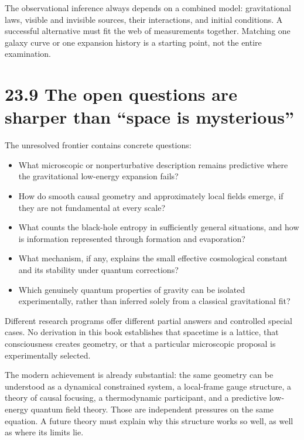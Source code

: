 \documentclass[
  11pt,
  letterpaper,
  oneside,
  openany]{scrbook}
\providecommand{\tightlist}{%
  \setlength{\itemsep}{0pt}\setlength{\parskip}{0pt}}
\begin{document}
The observational inference always depends on a combined model:
gravitational laws, visible and invisible sources, their interactions,
and initial conditions. A successful alternative must fit the web of
measurements together. Matching one galaxy curve or one expansion
history is a starting point, not the entire examination.

\hypertarget{the-open-questions-are-sharper-than-space-is-mysterious}{%
\section{23.9 The open questions are sharper than ``space is
mysterious''}\label{the-open-questions-are-sharper-than-space-is-mysterious}}

The unresolved frontier contains concrete questions:

\begin{itemize}
\tightlist
\item
  What microscopic or nonperturbative description remains predictive
  where the gravitational low-energy expansion fails?
\item
  How do smooth causal geometry and approximately local fields emerge,
  if they are not fundamental at every scale?
\item
  What counts the black-hole entropy in sufficiently general situations,
  and how is information represented through formation and evaporation?
\item
  What mechanism, if any, explains the small effective cosmological
  constant and its stability under quantum corrections?
\item
  Which genuinely quantum properties of gravity can be isolated
  experimentally, rather than inferred solely from a classical
  gravitational fit?
\end{itemize}

Different research programs offer different partial answers and
controlled special cases. No derivation in this book establishes that
spacetime is a lattice, that consciousness creates geometry, or that a
particular microscopic proposal is experimentally selected.

The modern achievement is already substantial: the same geometry can be
understood as a dynamical constrained system, a local-frame gauge
structure, a theory of causal focusing, a thermodynamic participant, and
a predictive low-energy quantum field theory. Those are independent
pressures on the same equation. A future theory must explain why this
structure works so well, as well as where its limits lie.
\end{document}
